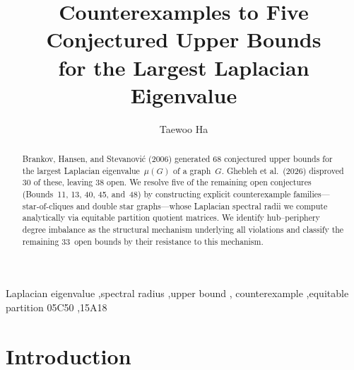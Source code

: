 \documentclass[preprint,12pt]{elsarticle}
\theoremstyle{definition}
\theoremstyle{remark}
\begin{document}
\begin{frontmatter}

\title{Counterexamples to Five Conjectured Upper Bounds\\
  for the Largest Laplacian Eigenvalue}

\author[inst1]{Taewoo Ha}


\begin{abstract}
  Brankov, Hansen, and Stevanovi\'{c} (2006) generated 68 conjectured
  upper bounds for the largest Laplacian
  eigenvalue~$\mu(G)$ of a graph~$G$. Ghebleh et al.\ (2026) disproved
  30 of these, leaving 38 open. We resolve five of the remaining open
  conjectures (Bounds~11, 13, 40, 45, and~48) by constructing explicit
  counterexample families---star-of-cliques and double star
  graphs---whose Laplacian spectral radii we compute analytically via
  equitable partition quotient matrices. We identify hub--periphery degree
  imbalance as the structural mechanism underlying all violations and
  classify the remaining 33~open bounds by their resistance to this mechanism.
\end{abstract}

\begin{keyword}
  Laplacian eigenvalue \sep spectral radius \sep upper bound \sep
  counterexample \sep equitable partition
  \MSC[2020] 05C50 \sep 15A18
\end{keyword}

\end{frontmatter}

\section{Introduction}\label{sec:intro}
\end{document}
